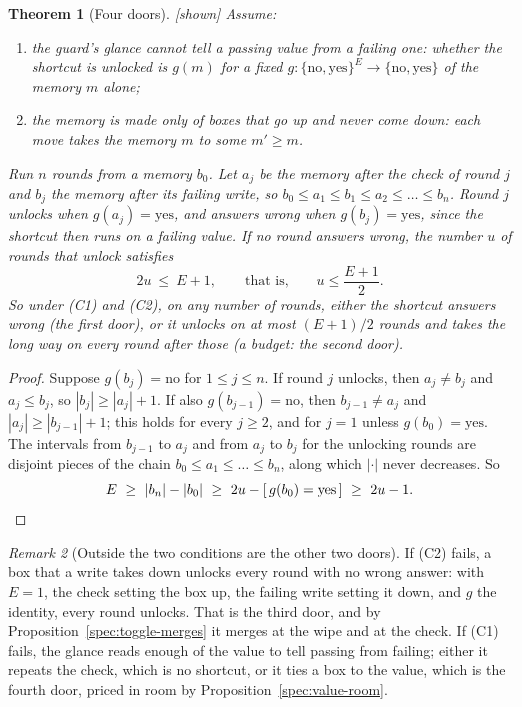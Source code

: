 \documentclass[11pt, a4paper]{article}
\theoremstyle{plain}
\newtheorem{theorem}{Theorem}[section]
\theoremstyle{definition}
\theoremstyle{remark}
\newtheorem{remark}[theorem]{Remark}
\newcommand{\Bool}{\{\mathrm{no},\mathrm{yes}\}}
\newcommand{\kind}[1]{\textup{[#1]}}
\begin{document}
\begin{theorem}[Four doors]\label{spec:four-doors} \kind{shown}
Assume:
\begin{enumerate}[label=(C\arabic*)]
\item the guard's glance cannot tell a passing value from a failing one: whether the shortcut is unlocked
is $g(m)$ for a fixed $g:\{\mathrm{no},\mathrm{yes}\}^E\to\Bool$ of the memory $m$ alone;
\item the memory is made only of boxes that go up and never come down: each move takes the memory $m$ to
some $m'\ge m$.
\end{enumerate}
Run $n$ rounds from a memory $b_0$. Let $a_j$ be the memory after the check of round $j$ and $b_j$ the
memory after its failing write, so $b_0\le a_1\le b_1\le a_2\le\dots\le b_n$. Round $j$ \emph{unlocks} when
$g(a_j)=\mathrm{yes}$, and \emph{answers wrong} when $g(b_j)=\mathrm{yes}$, since the shortcut then runs on a
failing value. If no round answers wrong, the number $u$ of rounds that unlock satisfies
\[
2u\ \le\ E+1,\qquad\text{that is,}\qquad u\le\frac{E+1}{2}.
\]
So under (C1) and (C2), on any number of rounds, either the shortcut answers wrong (the first door), or it
unlocks on at most $(E+1)/2$ rounds and takes the long way on every round after those (a budget: the second
door).
\end{theorem}

\begin{proof}
Suppose $g(b_j)=\mathrm{no}$ for $1\le j\le n$. If round $j$ unlocks, then $a_j\ne b_j$ and $a_j\le b_j$, so
$|b_j|\ge|a_j|+1$. If also $g(b_{j-1})=\mathrm{no}$, then $b_{j-1}\ne a_j$ and $|a_j|\ge|b_{j-1}|+1$; this
holds for every $j\ge2$, and for $j=1$ unless $g(b_0)=\mathrm{yes}$. The intervals from $b_{j-1}$ to $a_j$
and from $a_j$ to $b_j$ for the unlocking rounds are disjoint pieces of the chain $b_0\le a_1\le\dots\le b_n$,
along which $|\cdot|$ never decreases. So
\[
E\ \ge\ |b_n|-|b_0|\ \ge\ 2u-[\,g(b_0)=\mathrm{yes}\,]\ \ge\ 2u-1 .\qedhere
\]
\end{proof}

\begin{remark}[Outside the two conditions are the other two doors]\label{spec:other-doors}
If (C2) fails, a box that a write takes down unlocks every round with no wrong answer: with $E=1$, the check
setting the box up, the failing write setting it down, and $g$ the identity, every round unlocks. That is the
third door, and by Proposition~\ref{spec:toggle-merges} it merges at the wipe and at the check. If (C1) fails,
the glance reads enough of the value to tell passing from failing; either it repeats the check, which is no
shortcut, or it ties a box to the value, which is the fourth door, priced in room by
Proposition~\ref{spec:value-room}.
\end{remark}
\end{document}
